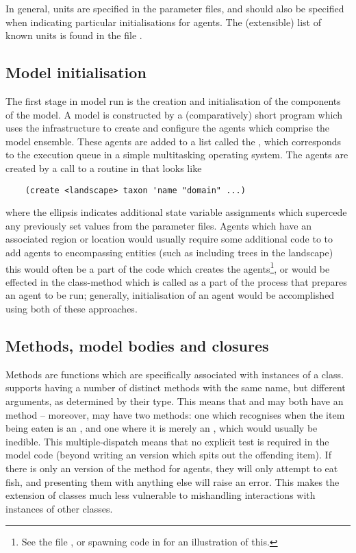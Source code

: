 In general, units are specified in the parameter
files, and should also be specified when indicating particular
initialisations for agents.  The (extensible) list of known units is
found in the file .


\subsection{Model initialisation}

The first stage in model run is the creation and initialisation of the
components of the model. A model is constructed by a (comparatively)
short \Scheme program which uses the infrastructure to create
and configure the agents which comprise the model ensemble.  These
agents are added to a list called the , which
corresponds to the execution queue in a simple multitasking operating
system. The agents are created by a call to a routine in
 that looks like
\begin{verbatim}
    (create <landscape> taxon 'name "domain" ...)
\end{verbatim}
where the ellipsis indicates additional state variable
assignments which supercede any previously set values from the
parameter files. Agents which have an associated region or location
would usually require some additional code to to add agents to
encompassing entities (such as including trees in the landscape) this
would often be a part of the code which creates the
agents\footnote{See the file , or spawning
  code in  for an illustration of this.},
or would be effected in the class-method 
which is called as a part of the process that prepares an agent to be
run; generally, initialisation of an agent would be accomplished using
both of these approaches.


\subsection{Methods, model bodies and closures}

Methods are functions which are specifically associated with instances
of a class.  \SCLOS supports having a number of distinct methods with
the same name, but different arguments, as determined by their type.
This means that and  may both have an
 method -- moreover,  may have two
 methods: one which recognises when the item being eaten
is an , and one where it is merely an ,
which would usually be inedible.  This multiple-dispatch means that no
explicit test is required in the model code (beyond writing an
 version which spits out the offending item).  If there is
only an  version of the  method for
 agents, they will only attempt to eat fish, and
presenting them with anything else will raise an error.  This makes
the extension of classes much less vulnerable to mishandling
interactions with instances of other classes.

